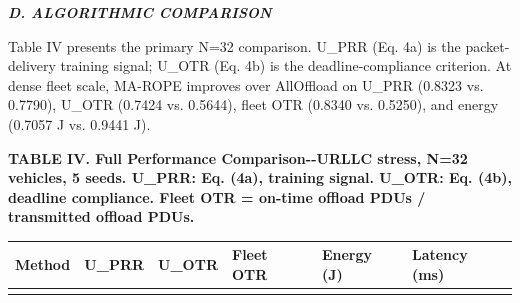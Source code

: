 \documentclass[journal,10pt,twocolumn]{IEEEtran}
\begin{document}
\emph{\textbf{D. ALGORITHMIC COMPARISON}}

Table IV presents the primary N=32 comparison. U\_PRR (Eq. 4a) is the
packet-delivery training signal; U\_OTR (Eq. 4b) is the
deadline-compliance criterion. At dense fleet scale, MA-ROPE improves
over AllOffload on U\_PRR (0.8323 vs. 0.7790), U\_OTR (0.7424 vs.
0.5644), fleet OTR (0.8340 vs. 0.5250), and energy (0.7057 J vs. 0.9441
J).

\textbf{TABLE IV. Full Performance Comparison-\/-URLLC stress, N=32
vehicles, 5 seeds. U\_PRR: Eq. (4a), training signal. U\_OTR: Eq. (4b),
deadline compliance. Fleet OTR = on-time offload PDUs / transmitted
offload PDUs.}

{\def\LTcaptype{none} %
\begin{longtable}[]{@{}
  >{\raggedright\arraybackslash}p{}
  >{\centering\arraybackslash}p{}
  >{\centering\arraybackslash}p{}
  >{\centering\arraybackslash}p{}
  >{\centering\arraybackslash}p{}
  >{\centering\arraybackslash}p{}@{}}
\toprule\noalign{}
\begin{minipage}[b]{\linewidth}\raggedright
\textbf{Method}
\end{minipage} & \begin{minipage}[b]{\linewidth}\centering
\textbf{U\_PRR}
\end{minipage} & \begin{minipage}[b]{\linewidth}\centering
\textbf{U\_OTR}
\end{minipage} & \begin{minipage}[b]{\linewidth}\centering
\textbf{Fleet OTR}
\end{minipage} & \begin{minipage}[b]{\linewidth}\centering
\textbf{Energy (J)}
\end{minipage} & \begin{minipage}[b]{\linewidth}\centering
\textbf{Latency (ms)}
\end{minipage} \\
\midrule\noalign{}

\bottomrule\noalign{}


\end{longtable}}
\end{document}
